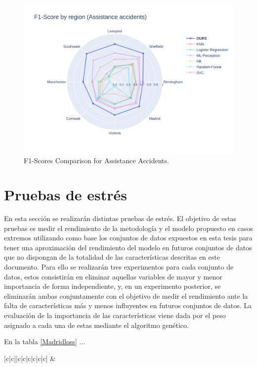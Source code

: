 \documentclass{uathesis-es}
\begin{document}
{	\begin{figure}[H]
		\centering
		\includegraphics[width=150mm]{Figures/Assistance.png}
		\caption{F1-Scores Comparison for Assistance Accidents.}
		\label{GlobalAssistanceF1Score}
	\end{figure}
	
	\section{Pruebas de estrés}
	
	
	En esta sección se realizarán distintas pruebas de estrés. El objetivo de estas pruebas es medir el rendimiento de la metodología y el modelo propuesto en casos extremos utilizando como base los conjuntos de datos expuestos en esta tesis para tener una aproximación del rendimiento del modelo en futuros conjuntos de datos que no dispongan de la totalidad de las características descritas en este documento. Para ello se realizarán tres experimentos para cada conjunto de datos, estos consistirán en eliminar aquellas variables de mayor y menor importancia de forma independiente, y, en un experimento posterior, se eliminarán ambas conjuntamente con el objetivo de medir el rendimiento ante la falta de características más y menos influyentes en futuros conjuntos de datos. La evaluación de la importancia de las características viene dada por el peso asignado a cada una de estas mediante el algoritmo genético.
	
	En la tabla \ref{Madridloss} ...
	
	\begin{table}[H]
		\begin{center}
			\begin{tabular}{|c|c||c|c|c|c|c|c|}
				\hline
				 &
				 \\ \hline
				

\end{tabular}
\end{center}
\end{table}}
\end{document}
